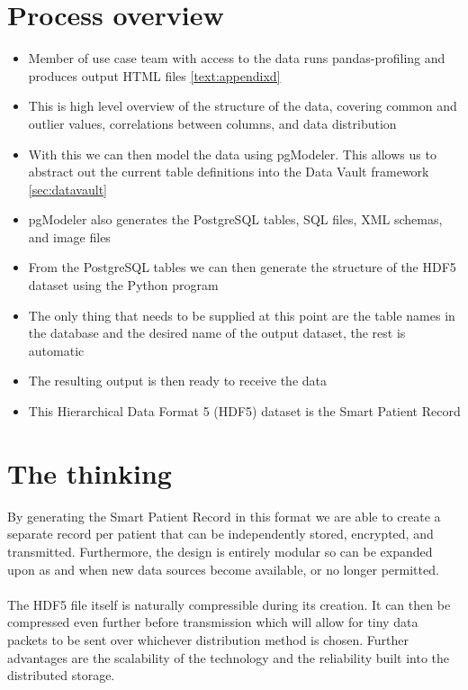 \section{Process overview}
\begin{itemize}
    \item Member of use case team with access to the data runs pandas-profiling and produces output HTML files \ref{text:appendixd}
    \item This is high level overview of the structure of the data, covering common and outlier values, correlations between columns, and data distribution
    \item With this we can then model the data using pgModeler. This allows us to abstract out the current table definitions into the Data Vault framework \ref{sec:datavault}
    \item pgModeler also generates the PostgreSQL tables, SQL files, XML schemas, and image files
    \item From the PostgreSQL tables we can then generate the structure of the HDF5 dataset using the Python program
    \item The only thing that needs to be supplied at this point are the table names in the database and the desired name of the output dataset, the rest is automatic
    \item The resulting output is then ready to receive the data
    \item This Hierarchical Data Format 5 (HDF5) dataset is the Smart Patient Record
\end{itemize}

\section{The thinking}

By generating the Smart Patient Record in this format we are able to create a separate record per patient that can be independently stored, encrypted, and transmitted. Furthermore, the design is entirely modular so can be expanded upon as and when new data sources become available, or no longer permitted.
\\ \\
\noindent
The HDF5 file itself is naturally compressible during its creation. It can then be compressed even further before transmission which will allow for tiny data packets to be sent over whichever distribution method is chosen. Further advantages are the scalability of the technology and the reliability built into the distributed storage.

